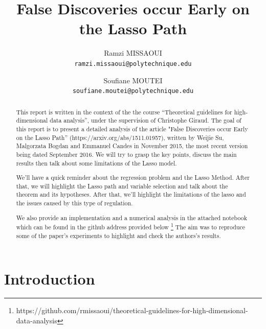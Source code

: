\documentclass[10pt,onecolumn,letterpaper]{article}
\begin{document}
\title{False Discoveries occur Early on the Lasso Path}

\author{
   Ramzi MISSAOUI\\
{\tt\small ramzi.missaoui@polytechnique.edu}
\and
Soufiane MOUTEI\\
{\tt\small soufiane.moutei@polytechnique.edu}
}

\maketitle

\begin{abstract}
   This report is written in the context of the the course “Theoretical guidelines for high-dimensional data analysis”, under the supervision of Christophe Giraud.
The goal of this report is to present a detailed analysis of the article  "False Discoveries occur Early on the Lasso Path” (https://arxiv.org/abs/1511.01957),  written by Weijie Su, Malgorzata Bogdan and Emmanuel Candes in November 2015, the most recent version being dated September 2016. We will try to grasp the key points, discuss the main results then talk about some limitations of the Lasso model. 

We'll have a quick reminder about the regression problem and the Lasso Method. After that, we will highlight the Lasso path and variable selection and talk about the theorem and its hypotheses. After that, we’ll highlight the limitations of the lasso and the issues caused by this type of regulation.

We also provide an implementation and a numerical analysis in the attached notebook which can be found in the github address provided below \footnote{https://github.com/rmissaoui/theoretical-guidelines-for-high-dimensional-data-analysis} The aim was to reproduce some of the paper's experiments to highlight and check the authors's results.
\end{abstract}

\tableofcontents


\section{Introduction}
\end{document}
